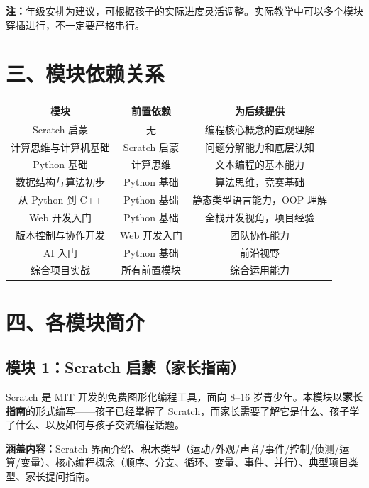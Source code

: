 \documentclass[a4paper,12pt]{ctexart}
\begin{document}
\vspace{0.3cm}
\textbf{注：}年级安排为建议，可根据孩子的实际进度灵活调整。实际教学中可以多个模块穿插进行，不一定要严格串行。

\section*{三、模块依赖关系}

\begin{center}
\begin{tabular}{|c|c|c|}
\hline
\textbf{模块} & \textbf{前置依赖} & \textbf{为后续提供} \\ \hline
Scratch 启蒙 & 无 & 编程核心概念的直观理解 \\ \hline
计算思维与计算机基础 & Scratch 启蒙 & 问题分解能力和底层认知 \\ \hline
Python 基础 & 计算思维 & 文本编程的基本能力 \\ \hline
数据结构与算法初步 & Python 基础 & 算法思维，竞赛基础 \\ \hline
从 Python 到 C++ & Python 基础 & 静态类型语言能力，OOP 理解 \\ \hline
Web 开发入门 & Python 基础 & 全栈开发视角，项目经验 \\ \hline
版本控制与协作开发 & Web 开发入门 & 团队协作能力 \\ \hline
AI 入门 & Python 基础 & 前沿视野 \\ \hline
综合项目实战 & 所有前置模块 & 综合运用能力 \\ \hline
\end{tabular}
\end{center}

\section*{四、各模块简介}

\subsection*{模块 1：Scratch 启蒙（家长指南）}

Scratch 是 MIT 开发的免费图形化编程工具，面向 8--16 岁青少年。本模块以\textbf{家长指南}的形式编写——孩子已经掌握了 Scratch，而家长需要了解它是什么、孩子学了什么、以及如何与孩子交流编程话题。

\textbf{涵盖内容：}Scratch 界面介绍、积木类型（运动/外观/声音/事件/控制/侦测/运算/变量）、核心编程概念（顺序、分支、循环、变量、事件、并行）、典型项目类型、家长提问指南。
\end{document}
